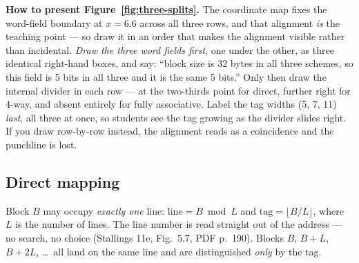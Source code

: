 \documentclass[11pt]{article}
\begin{document}
\textbf{How to present Figure~\ref{fig:three-splits}.} The coordinate map fixes the word-field boundary at $x = 6.6$ across all three rows, and that alignment \emph{is} the teaching point --- so draw it in an order that makes the alignment visible rather than incidental. \emph{Draw the three word fields first}, one under the other, as three identical right-hand boxes, and say: ``block size is 32 bytes in all three schemes, so this field is 5 bits in all three and it is the same 5 bits.'' Only then draw the internal divider in each row --- at the two-thirds point for direct, further right for 4-way, and absent entirely for fully associative. Label the tag widths (5, 7, 11) \emph{last}, all three at once, so students see the tag growing as the divider slides right. If you draw row-by-row instead, the alignment reads as a coincidence and the punchline is lost.

\subsection*{Direct mapping}

Block $B$ may occupy \emph{exactly one} line: $\text{line} = B \bmod L$ and $\text{tag} = \lfloor B/L \rfloor$, where $L$ is the number of lines. The line number is read straight out of the address --- no search, no choice (Stallings 11e, Fig.~5.7, PDF p.~190). Blocks $B$, $B+L$, $B+2L$, \dots\ all land on the same line and are distinguished \emph{only} by the tag.
\end{document}
